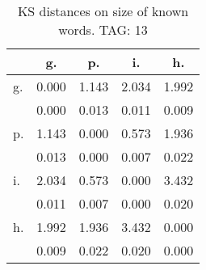 \begin{table}[h!]
\begin{center}
\begin{tabular}{| l | c | c | c | c |}\hline
 & g. & p. & i. & h. \\\hline
g. & 0.000  & 1.143  & 2.034  & 1.992 \\\hline
 & 0.000  & 0.013  & 0.011  & 0.009 \\\hline
p. & 1.143  & 0.000  & 0.573  & 1.936 \\\hline
 & 0.013  & 0.000  & 0.007  & 0.022 \\\hline
i. & 2.034  & 0.573  & 0.000  & 3.432 \\\hline
 & 0.011  & 0.007  & 0.000  & 0.020 \\\hline
h. & 1.992  & 1.936  & 3.432  & 0.000 \\\hline
 & 0.009  & 0.022  & 0.020  & 0.000 \\\hline
\end{tabular}
\caption{KS distances on size of known words. TAG: 13}
\end{center}
\end{table}